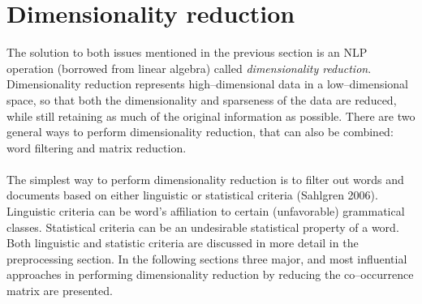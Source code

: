 \section{Dimensionality reduction}
The solution to both issues mentioned in the previous section is an NLP operation (borrowed from linear 
algebra) called \textit{dimensionality reduction}. Dimensionality reduction represents high--dimensional 
data in a low--dimensional space, so that both the dimensionality and sparseness of the data are reduced, 
while still 
retaining as much of the original information as possible. There are two general ways to perform 
dimensionality reduction, that can also be combined: word filtering and matrix reduction.
\\\\
The simplest way to perform dimensionality reduction is to filter out words and documents based on 
either linguistic or statistical criteria (Sahlgren 2006). Linguistic criteria can be word's affiliation to certain 
(unfavorable) 
grammatical classes. Statistical criteria can be an undesirable statistical property of a 
word. Both linguistic and statistic criteria are discussed in more detail in the preprocessing section. In 
the following sections three major, and most influential approaches in performing dimensionality reduction 
by reducing the co--occurrence matrix are presented.

